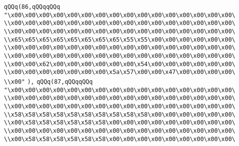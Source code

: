 \verb|qQQq(86,qQQqqQQq|\newline
\verb|"\x00\x00\x00\x00\x00\x00\x00\x00\x00\x00\x00\x00\x00\x00\x00\x00\|\newline
\verb|\\x00\x00\x00\x00\x00\x00\x00\x00\x00\x00\x00\x00\x00\x00\x00\x00\|\newline
\verb|\\x00\x00\x00\x00\x00\x00\x00\x00\x00\x00\x00\x00\x00\x00\x00\x00\|\newline
\verb|\\x65\x65\x65\x65\x65\x65\x65\x65\x55\x55\x00\x00\x00\x00\x00\x00\|\newline
\verb|\\x00\x00\x00\x00\x00\x00\x00\x00\x00\x00\x00\x00\x00\x00\x00\x00\|\newline
\verb|\\x00\x00\x00\x00\x00\x00\x00\x00\x00\x00\x00\x00\x00\x00\x00\x00\|\newline
\verb|\\x00\x00\x62\x00\x00\x00\x00\x00\x00\x54\x00\x00\x00\x00\x00\x00\|\newline
\verb|\\x00\x00\x00\x00\x00\x00\x00\x5a\x57\x00\x00\x47\x00\x00\x00\x00\|\newline
\verb|\\x00"|\newline
\verb|),|\newline
\verb|qQQq(87,qQQqqQQq|\newline
\verb|"\x00\x00\x00\x00\x00\x00\x00\x00\x00\x00\x00\x00\x00\x00\x00\x00\|\newline
\verb|\\x00\x00\x00\x00\x00\x00\x00\x00\x00\x00\x00\x00\x00\x00\x00\x00\|\newline
\verb|\\x00\x00\x00\x00\x00\x00\x00\x00\x00\x00\x00\x00\x00\x00\x00\x00\|\newline
\verb|\\x58\x58\x58\x58\x58\x58\x58\x58\x58\x58\x00\x00\x00\x00\x00\x00\|\newline
\verb|\\x00\x58\x58\x58\x58\x58\x58\x00\x00\x00\x00\x00\x00\x00\x00\x00\|\newline
\verb|\\x00\x00\x00\x00\x00\x00\x00\x00\x00\x00\x00\x00\x00\x00\x00\x00\|\newline
\verb|\\x00\x58\x58\x58\x58\x58\x58\x00\x00\x00\x00\x00\x00\x00\x00\x00\|\newline

